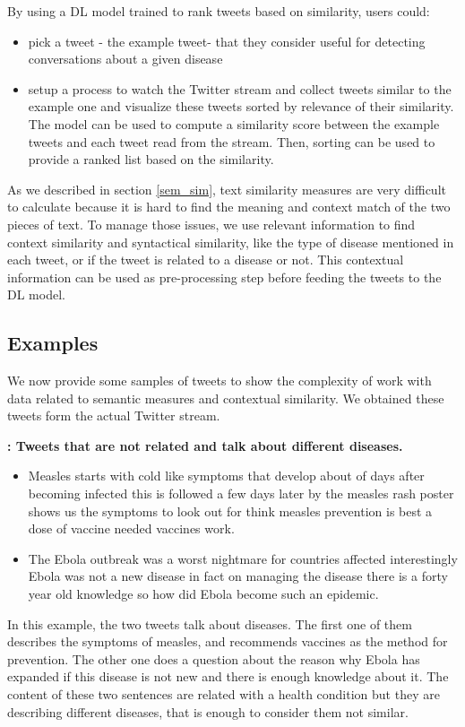 \documentclass[12pt]{report}
\begin{document}
By using a \ac{DL} model trained to rank tweets based on similarity, users could: 
\begin{itemize}
	\item pick a tweet - the example tweet- that they consider useful for detecting conversations about a given disease 
	\item setup a process to watch the Twitter stream and collect tweets similar  to the example one and visualize these tweets  sorted by 
	relevance of their similarity. The model can be used to compute a similarity score between the example tweets and each tweet read from the stream. Then, sorting can be used to provide a ranked list based on the similarity.
\end{itemize} 
As we described in section \ref{sem_sim},   text similarity measures are very difficult to calculate  because it is hard to find the meaning and context match of the two pieces of text. To manage those issues, we use relevant information to find context similarity and syntactical similarity, like the type of disease mentioned in each tweet,  or if the tweet is related to a disease or not. This contextual information can be used as pre-processing step before feeding 
the tweets to the \ac{DL} model.


\subsection{Examples}
We now provide some samples of tweets to show the complexity of work with data related to semantic measures and contextual similarity.
We obtained these tweets form the actual Twitter stream.

\begin{definition} {\bf : Tweets that are not related  and talk about different diseases.}
	\begin{itemize}[nolistsep]
		\item Measles starts with cold like symptoms that develop about of days after becoming infected this is followed a few days later by the measles rash poster shows us the symptoms to look out for think measles prevention is best a dose of vaccine needed vaccines work.
		\item The Ebola outbreak was a worst nightmare for countries affected interestingly Ebola was not a new disease in fact on managing the disease there is a forty year old knowledge so how did Ebola become such an epidemic.
	\end{itemize}
\end{definition}
In this example, the two tweets talk about diseases. The first one of them describes the symptoms of measles, and recommends vaccines as the method
for  prevention. The other one does a question about the reason why Ebola has expanded if this disease is not new and there is enough knowledge about it.  The content of these two sentences are related with a health condition but they are describing different diseases, that is enough to consider them not similar.
\end{document}
